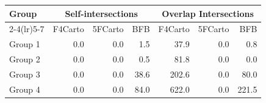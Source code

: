 
\begin{tabular}{lrrr|rrr}
\toprule
\multirow{2}{*}{Group} & \multicolumn{3}{c}{Self-intersections} & \multicolumn{3}{c}{Overlap Intersections} \\
\cmidrule(lr){2-4}\cmidrule(lr){5-7}
                   & F4Carto & 5FCarto & BFB & F4Carto & 5FCarto & BFB \\
\midrule

Group 1 & 0.0 & 0.0 & 1.5 & 37.9 & 0.0 & 0.8 \\
Group 2 & 0.0 & 0.0 & 0.5 & 81.8 & 0.0 & 0.0 \\
Group 3 & 0.0 & 0.0 & 38.6 & 202.6 & 0.0 & 80.0 \\
Group 4 & 0.0 & 0.0 & 84.0 & 622.0 & 0.0 & 221.5 \\
\bottomrule
\end{tabular}
